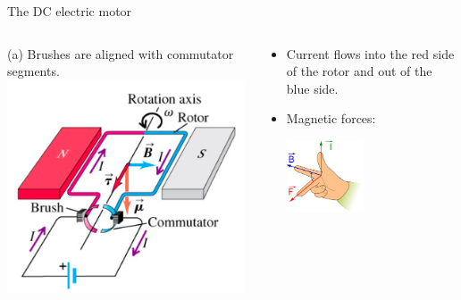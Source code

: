 \begin{frame}{The DC electric motor}

\begin{columns}
  \begin{column}{0.50\textwidth}
    \begin{center}
     (a) Brushes are aligned with commutator segments.\\
     \vspace{0.3cm}
     \includegraphics[width=0.99\textwidth]{./images/schematics/electric_motor_dc_operation_a.png}\\
    \end{center}
  \end{column}
  \begin{column}{0.50\textwidth}
    {\small
      \begin{itemize}
         \item Current flows into the red side of the rotor and out of the blue side.
         \item Magnetic forces:\\
          \begin{center}
              \includegraphics[width=0.45\textwidth]{./images/schematics/right_hand_rule_fbi.png}\\

\end{center}
\end{itemize}}
\end{column}
\end{columns}
\end{frame}
